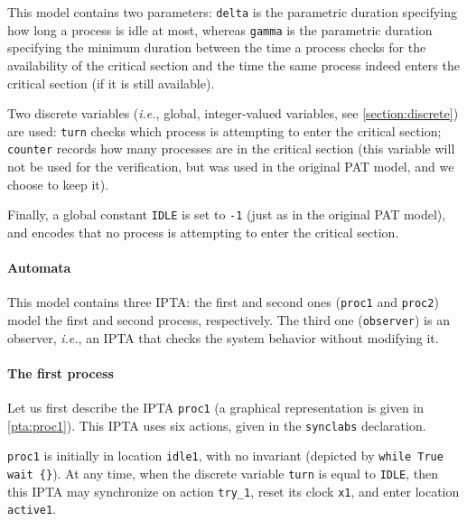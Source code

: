 \documentclass[a4paper,11pt]{report}
\makeatletter
\newcommand{\IPTA}{IPTA}
\newcommand{\pat}{PAT}
\newcommand{\styleIMI}[1]{\textcolor{imicolor}{\texttt{#1}}}
\newcommand{\ie}{\textcolor{colorok}{\textit{i.e.},\@}}
\makeatother
\begin{document}
This model contains two parameters: \styleIMI{delta} is the parametric duration specifying how long a process is idle at most, whereas \styleIMI{gamma} is the parametric duration specifying the minimum duration between the time a process checks for the availability of the critical section and the time the same process indeed enters the critical section (if it is still available).

Two discrete variables (\ie{} global, integer-valued variables, see \cref{section:discrete}) are used:
	\styleIMI{turn} checks which process is attempting to enter the critical section;
	\styleIMI{counter} records how many processes are in the critical section (this variable will not be used for the verification, but was used in the original \pat{} model, and we choose to keep it).

Finally, a global constant \styleIMI{IDLE} is set to \styleIMI{-1} (just as in the original \pat{} model), and encodes that no process is attempting to enter the critical section.





\paragraph{Automata}
This model contains three \IPTA{}:
the first and second ones (\styleIMI{proc1} and \styleIMI{proc2}) model the first and second process, respectively. The third one (\styleIMI{observer}) is an observer, \ie{} an \IPTA{} that checks the system behavior without modifying it.

\paragraph{The first process}
Let us first describe the \IPTA{} \styleIMI{proc1} (a graphical representation is given in \cref{pta:proc1}).
This \IPTA{} uses six actions, given in the \styleIMI{synclabs} declaration.

\styleIMI{proc1} is initially in location \styleIMI{idle1}, with no invariant (depicted by \styleIMI{while True wait \{\}}).
At any time, when the discrete variable \styleIMI{turn} is equal to \styleIMI{IDLE}, then this \IPTA{} may synchronize on action \styleIMI{try\_1}, reset its clock \styleIMI{x1}, and enter location \styleIMI{active1}.
\end{document}
